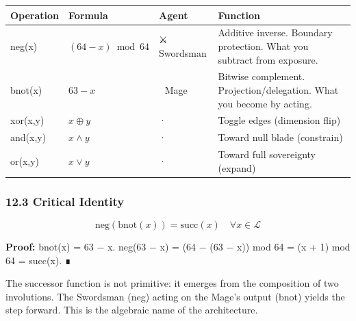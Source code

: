 \documentclass[
]{article}
\newcounter{none} %
\begin{document}
{\def\LTcaptype{none} %
\begin{longtable}[]{@{}
  >{\raggedright\arraybackslash}p{}
  >{\raggedright\arraybackslash}p{}
  >{\raggedright\arraybackslash}p{}
  >{\raggedright\arraybackslash}p{}@{}}
\toprule\noalign{}
\begin{minipage}[b]{\linewidth}\raggedright
Operation
\end{minipage} & \begin{minipage}[b]{\linewidth}\raggedright
Formula
\end{minipage} & \begin{minipage}[b]{\linewidth}\raggedright
Agent
\end{minipage} & \begin{minipage}[b]{\linewidth}\raggedright
Function
\end{minipage} \\
\midrule\noalign{}
\endhead
\bottomrule\noalign{}
\endlastfoot
neg(x) & \((64-x) \bmod 64\) & ⚔️ Swordsman & Additive inverse. Boundary
protection. What you subtract from exposure. \\
bnot(x) & \(63 - x\) & 🧙 Mage & Bitwise complement.
Projection/delegation. What you become by acting. \\
xor(x,y) & \(x \oplus y\) & · & Toggle edges (dimension flip) \\
and(x,y) & \(x \wedge y\) & · & Toward null blade (constrain) \\
or(x,y) & \(x \vee y\) & · & Toward full sovereignty (expand) \\
\end{longtable}
}

\subsubsection{12.3 Critical Identity}\label{critical-identity}

\[\text{neg}(\text{bnot}(x)) = \text{succ}(x) \quad \forall x \in \mathcal{L}\]

\textbf{Proof:} bnot(x) = 63 − x. neg(63 − x) = (64 − (63 − x)) mod 64 =
(x + 1) mod 64 = succ(x). ∎

The successor function is not primitive: it emerges from the composition
of two involutions. The Swordsman (neg) acting on the Mage's output
(bnot) yields the step forward. This is the algebraic name of the
architecture.
\end{document}
